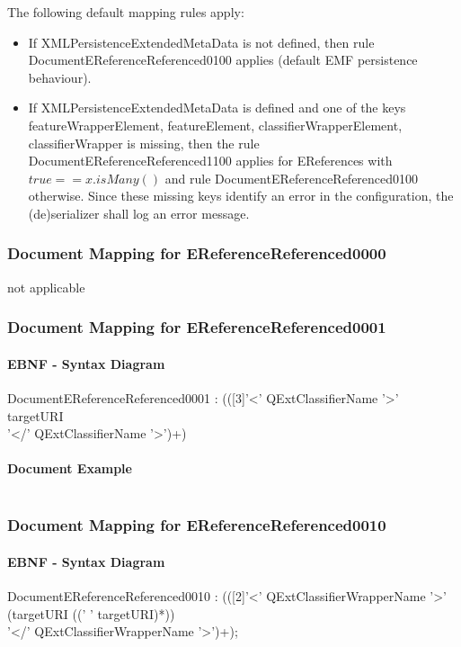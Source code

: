 \documentclass[11pt,a4paper]{article}
\begin{document}
The following default mapping rules apply:
\begin{itemize}
\item If XMLPersistenceExtendedMetaData is not defined, then rule DocumentEReferenceReferenced0100 applies (default EMF persistence behaviour).
\item If XMLPersistenceExtendedMetaData is defined and one of the keys featureWrapperElement, featureElement, classifierWrapperElement, classifierWrapper is missing, then the rule DocumentEReferenceReferenced1100 applies for EReferences with $true==x.isMany()$ and rule DocumentEReferenceReferenced0100 otherwise. Since these missing keys identify an error in the configuration, the (de)serializer shall log an error message.
\end{itemize}


\subsubsection{Document Mapping for EReferenceReferenced0000}
not applicable

\subsubsection{Document Mapping for EReferenceReferenced0001}
\paragraph{EBNF - Syntax Diagram}
\begin{rail}
DocumentEReferenceReferenced0001 : (([3]'<' QExtClassifierName  '>' \\ 
targetURI \\ 
'</' QExtClassifierName  '>')+)
\end{rail}

\paragraph{Document Example}
\inputminted[fontsize=\footnotesize]{xml}{examples/EReferenceReferenced0001.xml}


\subsubsection{Document Mapping for EReferenceReferenced0010}
\paragraph{EBNF - Syntax Diagram}
\begin{rail}
DocumentEReferenceReferenced0010 : (([2]'<' QExtClassifierWrapperName '>'\\
(targetURI ((' ' targetURI)*)) \\
'</' QExtClassifierWrapperName '>')+);
\end{rail}
\end{document}
